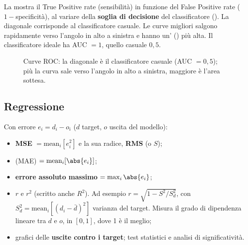 La  mostra il True Positive rate (sensibilità) in funzione del False Positive rate
($1-$specificità), al variare della \textbf{soglia di decisione} del classificatore (). La
diagonale corrisponde al classificatore casuale. Le curve migliori salgono rapidamente verso l'angolo in alto a
sinistra e hanno un' () più alta. Il classificatore ideale ha AUC $=1$,
quello casuale $0{,}5$.

\begin{figure}[ht]
\centering
{}
\caption{Curve ROC: la diagonale è il classificatore casuale (AUC $=0{,}5$); più la curva sale verso l'angolo in
alto a sinistra, maggiore è l'area sottesa.}
\label{fig:roc}
\end{figure}

\subsection{Regressione}

Con errore $e_i = d_i - o_i$ ($d$ target, $o$ uscita del modello):
\begin{itemize}
  \item \textbf{MSE} $=\mathrm{mean}_i[e_i^2]$ e la sua radice, \textbf{RMS} (o $S$);
  \item {} (MAE) $=\mathrm{mean}_i[\abs{e_i}]$;
  \item \textbf{errore assoluto massimo} $=\max_i\abs{e_i}$;
  \item {} $r$ e  $r^2$ (scritto anche
        $R^2$). Ad esempio $r = \sqrt{1-S^2/S_d^2}$, con $S_d^2 = \mathrm{mean}_i[(d_i-\bar d)^2]$ varianza del
        target. Misura il grado di dipendenza lineare tra $d$ e $o$, in $[0,1]$, dove 1 è il meglio;
  \item grafici delle \textbf{uscite contro i target}; test statistici e analisi di significatività.
\end{itemize}

